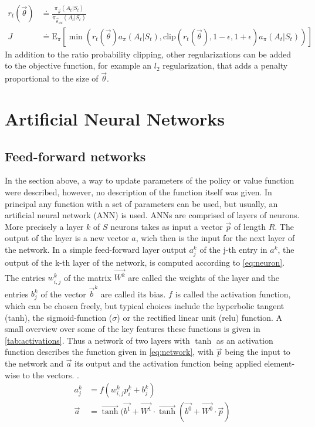 \begin{align}
	r_t(\vec{\theta}) &\doteq \frac{\pi_{\vec{\theta}}(A_t \vert S_t)}{\pi_{\vec{\theta}_{old}} (A_t \vert S_t)} \\
	J &\doteq \mathrm{E}_\pi \left[\min \left(r_t(\vec{\theta}) a_\pi(A_t \vert S_t), \mathrm{clip}(r_t(\vec{\theta}), 1- \epsilon, 1+\epsilon) a_\pi(A_t \vert S_t) \right) \right] \label{eq:object_ppo}
\end{align}
In addition to the ratio probability clipping, other regularizations can be added to the objective function, for example an $l_2$ regularization, that adds a penalty proportional to the size of $\vec{\theta}$.



\section{Artificial Neural Networks}
\subsection{Feed-forward networks}
In the section above, a way to update parameters of the policy or value function were described, however, no description of the function itself was given. In principal any function with a set of parameters can be used, but usually, an artificial neural network (ANN) is used. ANNs are comprised of layers of neurons. More precisely a layer $k$ of $S$ neurons takes as input a vector $\vec{p}$ of length $R$. The output of the layer is a new vector $a$, wich then is the input for the next layer of the network. In a simple feed-forward layer output $a_j^k$ of the j-th entry in $a^k$, the output of the k-th layer of the network, is computed according to \eqref{eq:neuron}. The entries $w_{i,j}^k$ of the matrix $\vec{W^k}$ are called the weights of the layer and the entries $b_j^k$ of the vector $\vec{b}^k$ are called its bias. $f$ is called the activation function, which can be chosen freely, but typical choices include the hyperbolic tangent (tanh), the sigmoid-function ($\sigma$) or the rectified linear unit ($\mathrm{relu}$) function. A small overview over some of the key features these functions is given in \autoref{tab:activations}. Thus a network of two layers with $\tanh$ as an activation function describes the function given in \eqref{eq:network}, with $\vec{p}$  being the input to the network and $\vec{a}$ its output and the activation function being applied element-wise to the vectors. \cite[p. 2-2 - 2-12]{demuth_neural_2014}.
\begin{align}
	a_j^k &= f(w_{i,j}^k p^k_i + b_j^k) \label{eq:neuron} \\
	\vec{a} &= \vec{\tanh} (\vec{b^1} + \vec{W^1} \cdot \vec{\tanh}( \vec{b^0} + \vec{W^0} \cdot \vec{p} ) \label{eq:network}
\end{align}

